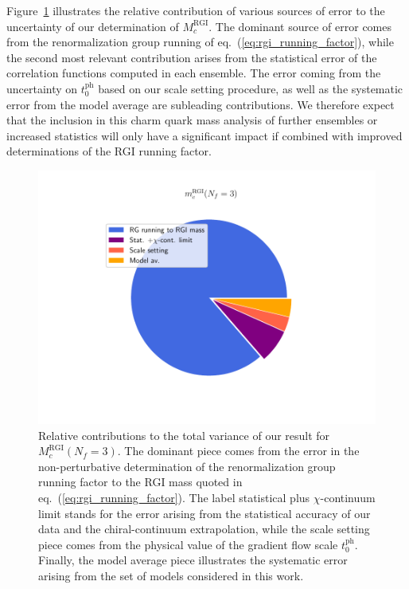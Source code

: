 Figure~\ref{fig:mc_error_contributions} illustrates the relative contribution of various sources of error to the
uncertainty of our determination of $M_c^{\mathrm{RGI}}$. The dominant source of error comes from the 
renormalization group running of eq.~(\ref{eq:rgi_running_factor}), while the second most relevant 
contribution arises from the statistical error of  the correlation functions computed in each ensemble.  
The  error coming from  the uncertainty on $t_0^{\mathrm{ph}}$ based on our  scale setting  procedure, as well as the 
systematic error from the model average  are subleading contributions. We therefore expect
that the 
inclusion in this charm quark mass analysis of further ensembles or increased statistics will only have a significant impact if combined with improved determinations of the RGI running factor.
%
\begin{figure}
	\centering
	\includegraphics[scale=0.5]{./cap6/figs/mc/mc_error_pie.pdf}
	\caption{Relative contributions to the total variance of our result for $M_c^{\mathrm{RGI}}(N_f=3)$. The dominant piece comes from the error in the non-perturbative determination of the renormalization group running factor to the RGI mass quoted in eq.~(\ref{eq:rgi_running_factor}). The label statistical plus $\chi$-continuum limit stands for the error arising from the statistical accuracy of our data and the chiral-continuum extrapolation, while the scale setting piece comes from the physical value of the gradient flow scale $t_0^{\mathrm{ph}}$. Finally, the model average piece illustrates the systematic error arising from the set of models considered in this work.
          }
	\label{fig:mc_error_contributions}
\end{figure}
%

